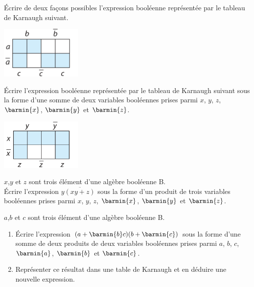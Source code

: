 \begin{exercice}
    \'Ecrire de deux façons possibles l'expression booléenne représentée par le tableau de Karnaugh suivant.
    \begin{center}
        \includegraphics[width=4cm]{boole/img/ex29.png}
    \end{center}
\end{exercice}

\begin{exercice}
    \'Ecrire l'expression booléenne représentée par le tableau de Karnaugh suivant sous la forme d'une somme de deux variables booléennes prises parmi $x$, $y$, $z$, $\barmin{x}
    $, $\barmin{y}$ et $\barmin{z}$.
    \begin{center}
        \includegraphics[width=4cm]{boole/img/ex30.png}
    \end{center}
\end{exercice}

\begin{exercice}
    $x$,$y$ et $z$ sont trois élément d'une algèbre booléenne B.\\

    \'Ecrire l'expression $y\overline{(xy+z)}$ sous la forme d'un produit de trois variables booléennes prises parmi $x$, $y$, $z$, $\barmin{x}
    $, $\barmin{y}$ et $\barmin{z}$.\\
\end{exercice}


\begin{exercice}
    $a$,$b$ et $c$ sont trois élément d'une algèbre booléenne B.

    \begin{enumerate}
        \item 	\'Ecrire  l'expression $(a+\barmin{b}c)(b+\barmin{c})$ sous la forme d'une somme de deux produits de deux variables booléennes prises parmi $a$, $b$, $c$, $\barmin{a}
              $, $\barmin{b}$ et $\barmin{c}$.
        \item 	Représenter ce résultat dans une table de Karnaugh et en déduire une nouvelle expression.
    \end{enumerate}
\end{exercice}

